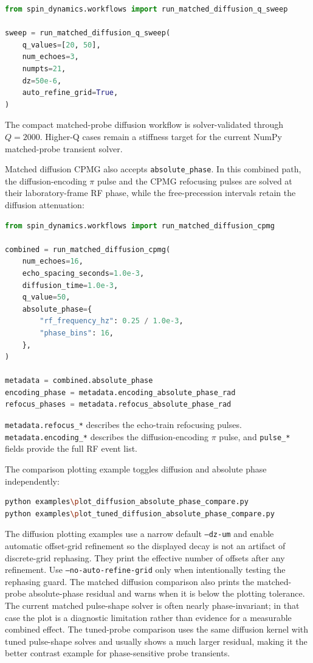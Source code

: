 \documentclass[11pt,oneside]{report}
\newcommand{\code}[1]{\texttt{#1}}
\begin{document}
\begin{lstlisting}[language=Python]
from spin_dynamics.workflows import run_matched_diffusion_q_sweep

sweep = run_matched_diffusion_q_sweep(
    q_values=[20, 50],
    num_echoes=3,
    numpts=21,
    dz=50e-6,
    auto_refine_grid=True,
)
\end{lstlisting}

The compact matched-probe diffusion workflow is solver-validated through
\(Q=2000\). Higher-Q cases remain a stiffness target for the current NumPy
matched-probe transient solver.

Matched diffusion CPMG also accepts \code{absolute\_phase}.  In this combined
path, the diffusion-encoding \(\pi\) pulse and the CPMG refocusing pulses are
solved at their laboratory-frame RF phase, while the free-precession intervals
retain the diffusion attenuation:

\begin{lstlisting}[language=Python]
from spin_dynamics.workflows import run_matched_diffusion_cpmg

combined = run_matched_diffusion_cpmg(
    num_echoes=16,
    echo_spacing_seconds=1.0e-3,
    diffusion_time=1.0e-3,
    q_value=50,
    absolute_phase={
        "rf_frequency_hz": 0.25 / 1.0e-3,
        "phase_bins": 16,
    },
)

metadata = combined.absolute_phase
encoding_phase = metadata.encoding_absolute_phase_rad
refocus_phases = metadata.refocus_absolute_phase_rad
\end{lstlisting}

\code{metadata.refocus\_*} describes the echo-train refocusing pulses.
\code{metadata.encoding\_*} describes the diffusion-encoding \(\pi\) pulse,
and \code{pulse\_*} fields provide the full RF event list.

The comparison plotting example toggles diffusion and absolute phase
independently:

\begin{lstlisting}[language=bash]
python examples\plot_diffusion_absolute_phase_compare.py
python examples\plot_tuned_diffusion_absolute_phase_compare.py
\end{lstlisting}

The diffusion plotting examples use a narrow default \code{--dz-um} and enable
automatic offset-grid refinement so the displayed decay is not an artifact of
discrete-grid rephasing.  They print the effective number of offsets after any
refinement.  Use \code{--no-auto-refine-grid} only when intentionally testing
the rephasing guard.
The matched diffusion comparison also prints the matched-probe absolute-phase
residual and warns when it is below the plotting tolerance.  The current
matched pulse-shape solver is often nearly phase-invariant; in that case the
plot is a diagnostic limitation rather than evidence for a measurable combined
effect.
The tuned-probe comparison uses the same diffusion kernel with tuned
pulse-shape solves and usually shows a much larger residual, making it the
better contrast example for phase-sensitive probe transients.
\end{document}
